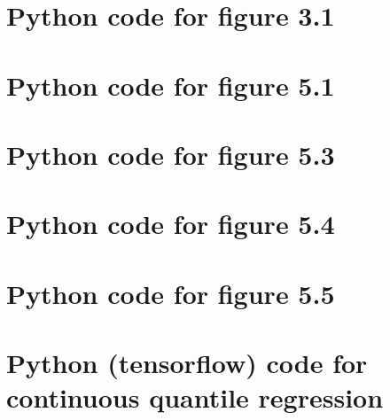 
\section{Python code for figure 3.1}
{\scriptsize
{}}

\section{Python code for figure 5.1}
{\scriptsize
{}}

\section{Python code for figure 5.3}
\label{code:efficient_decomposable_gaussian}
{\scriptsize
{}}

\section{Python code for figure 5.4}
\label{code:efficient_curlfree_gaussian}
{\scriptsize
{}}

\section{Python code for figure 5.5}
\label{code:efficient_divfree_gaussian}
{\scriptsize
{}}

\section{Python (tensorflow) code for continuous quantile regression}
\label{code:continuous_quantile}
{\scriptsize
{}}

\chapterend
